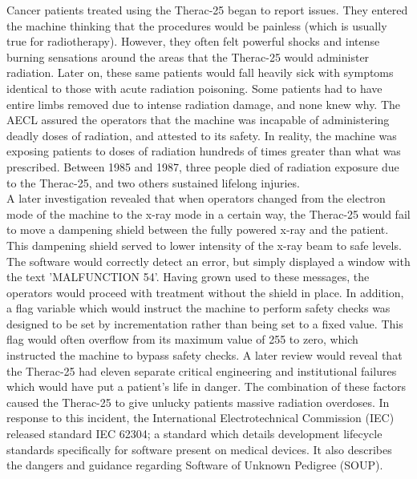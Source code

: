 \documentclass{article}
\begin{document}
Cancer patients treated using the Therac-25 began to report issues. They entered the machine thinking that the procedures would be painless (which is usually true for radiotherapy). However, they often felt powerful shocks and intense burning sensations around the areas that the Therac-25 would administer radiation. Later on, these same patients would fall heavily sick with symptoms identical to those with acute radiation poisoning. Some patients had to have entire limbs removed due to intense radiation damage, and none knew why. The AECL assured the operators that the machine was incapable of administering deadly doses of radiation, and attested to its safety.\cite{leveson-turner-1993} In reality, the machine was exposing patients to doses of radiation hundreds of times greater than what was prescribed.\cite{baase-henry-2019} Between 1985 and 1987, three people died of radiation exposure due to the Therac-25, and two others sustained lifelong injuries.\\

A later investigation revealed that when operators changed from the electron mode of the machine to the x-ray mode in a certain way, the Therac-25 would fail to move a dampening shield between the fully powered x-ray and the patient. This dampening shield served to lower intensity of the x-ray beam to safe levels. The software would correctly detect an error, but simply displayed a window with the text 'MALFUNCTION 54'. Having grown used to these messages, the operators would proceed with treatment without the shield in place. In addition, a flag variable which would instruct the machine to perform safety checks was designed to be set by incrementation rather than being set to a fixed value. This flag would often overflow from its maximum value of 255 to zero, which instructed the machine to bypass safety checks. A later review would reveal that the Therac-25 had eleven separate critical engineering and institutional failures which would have put a patient's life in danger. The combination of these factors caused the Therac-25 to give unlucky patients massive radiation overdoses. In response to this incident, the International Electrotechnical Commission (IEC) released standard IEC 62304; a standard which details development lifecycle standards specifically for software present on medical devices. It also describes the dangers and guidance regarding Software of Unknown Pedigree (SOUP).\\
\end{document}
